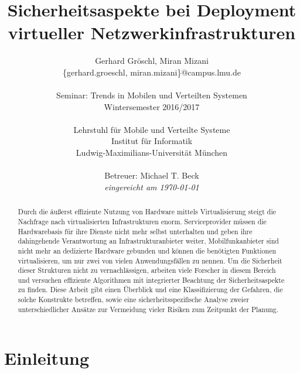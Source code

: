 \documentclass{lni}
\author{Gerhard Gröschl, Miran Mizani\\\{gerhard.groeschl, miran.mizani\}@campus.lmu.de\\\\
Seminar: Trends in Mobilen und Verteilten Systemen \\Wintersemester 2016/2017\\\\
Lehrstuhl für Mobile und Verteilte Systeme\\Institut für Informatik\\Ludwig-Maximilians-Universität München\\\\
Betreuer: Michael T. Beck\\\textit{eingereicht am \today}}
\title{Sicherheitsaspekte bei Deployment virtueller Netzwerkinfrastrukturen}
\begin{document}
\maketitle

\vfill

\begin{abstract}
Durch die äußerst effiziente Nutzung von Hardware mittels Virtualisierung steigt die Nachfrage nach virtualisierten Infrastrukturen enorm. Serviceprovider müssen die Hardwarebasis für ihre Dienste nicht mehr selbst unterhalten und geben ihre dahingehende Verantwortung an Infrastrukturanbieter weiter, Mobilfunkanbieter sind nicht mehr an dedizierte Hardware gebunden und können die benötigten Funktionen virtualisieren, um nur zwei von vielen Anwendungsfällen zu nennen. Um die Sicherheit dieser Strukturen nicht zu vernachlässigen, arbeiten viele Forscher in diesem Bereich und versuchen effiziente Algorithmen mit integrierter Beachtung der Sicherheitsaspekte zu finden. Diese Arbeit gibt einen Überblick und eine Klassifizierung der Gefahren, die solche Konstrukte betreffen, sowie eine sicherheitsspezifische Analyse zweier unterschiedlicher Ansätze zur Vermeidung vieler Risiken zum Zeitpunkt der Planung.
\end{abstract}


\newpage
\tableofcontents
\newpage

\section{Einleitung}
\label{sec:Einleitung}





\end{document}
